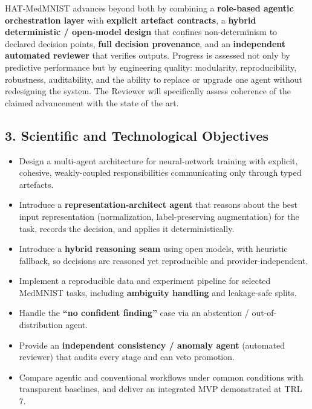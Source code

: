 \documentclass[11pt,a4paper]{article}
\begin{document}
HAT-MedMNIST advances beyond both by combining a \textbf{role-based agentic orchestration layer} with \textbf{explicit artefact contracts}, a \textbf{hybrid deterministic / open-model design} that confines non-determinism to declared decision points, \textbf{full decision provenance}, and an \textbf{independent automated reviewer} that verifies outputs. Progress is assessed not only by predictive performance but by engineering quality: modularity, reproducibility, robustness, auditability, and the ability to replace or upgrade one agent without redesigning the system. The Reviewer will specifically assess coherence of the claimed advancement with the state of the art.

\subsection*{3. Scientific and Technological Objectives}
\begin{itemize}
\item Design a multi-agent architecture for neural-network training with explicit, cohesive, weakly-coupled responsibilities communicating only through typed artefacts.
\item Introduce a \textbf{representation-architect agent} that reasons about the best input representation (normalization, label-preserving augmentation) for the task, records the decision, and applies it deterministically.
\item Introduce a \textbf{hybrid reasoning seam} using open models, with heuristic fallback, so decisions are reasoned yet reproducible and provider-independent.
\item Implement a reproducible data and experiment pipeline for selected MedMNIST tasks, including \textbf{ambiguity handling} and leakage-safe splits.
\item Handle the \textbf{``no confident finding''} case via an abstention / out-of-distribution agent.
\item Provide an \textbf{independent consistency / anomaly agent} (automated reviewer) that audits every stage and can veto promotion.
\item Compare agentic and conventional workflows under common conditions with transparent baselines, and deliver an integrated MVP demonstrated at TRL 7.
\end{itemize}
\end{document}
